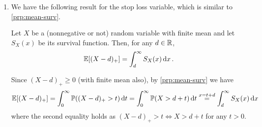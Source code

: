 \begin{enumerate}
\item We have the following result for the stop loss variable, which is
similar to \cref{prp:mean-surv}.
\begin{proposition}
\label{prp:mean-sl-surv}
Let \(X\) be a (nonnegative or not) random variable with finite mean and let
\(S_X(x)\) be its survival function. Then, for any \(d\in\mathbb{R}\),
\[
\mathbb{E}\qty[(X-d)_{+}]=\int_{d}^{\infty}S_X(x)\dd{x}.
\]
\end{proposition}
\begin{pf}
Since \((X-d)_{+}\ge 0\) (with finite mean also), by \cref{prp:mean-surv} we have
\[
\mathbb{E}\qty[(X-d)_{+}]=\int_{0}^{\infty}\mathbb{P}\qty((X-d)_{+}>t)\dd{t}
=\int_{0}^{\infty}\mathbb{P}\qty(X>d+t)\dd{t}
\overset{x=t+d}{=}\int_{d}^{\infty}S_X(x)\dd{x}
\]
where the second equality holds as \((X-d)_{+}>t\iff X>d+t\) for any \(t>0\).
\begin{center}
\end{center}
\end{pf}
\end{enumerate}
